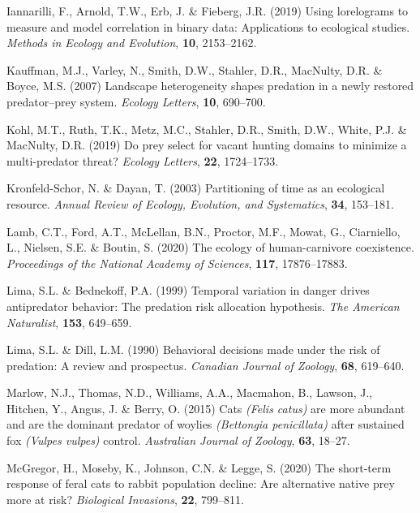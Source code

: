 \documentclass[]{elsarticle} %
\begin{document}
\leavevmode\hypertarget{ref-iannarilli2019lorelograms}{}%
Iannarilli, F., Arnold, T.W., Erb, J. \& Fieberg, J.R. (2019) Using lorelograms to measure and model correlation in binary data: Applications to ecological studies. \emph{Methods in Ecology and Evolution}, \textbf{10}, 2153--2162.

\leavevmode\hypertarget{ref-kauffman2007landscape}{}%
Kauffman, M.J., Varley, N., Smith, D.W., Stahler, D.R., MacNulty, D.R. \& Boyce, M.S. (2007) Landscape heterogeneity shapes predation in a newly restored predator--prey system. \emph{Ecology Letters}, \textbf{10}, 690--700.

\leavevmode\hypertarget{ref-kohl2019prey}{}%
Kohl, M.T., Ruth, T.K., Metz, M.C., Stahler, D.R., Smith, D.W., White, P.J. \& MacNulty, D.R. (2019) Do prey select for vacant hunting domains to minimize a multi-predator threat? \emph{Ecology Letters}, \textbf{22}, 1724--1733.

\leavevmode\hypertarget{ref-kronfeld2003partitioning}{}%
Kronfeld-Schor, N. \& Dayan, T. (2003) Partitioning of time as an ecological resource. \emph{Annual Review of Ecology, Evolution, and Systematics}, \textbf{34}, 153--181.

\leavevmode\hypertarget{ref-lamb2020ecology}{}%
Lamb, C.T., Ford, A.T., McLellan, B.N., Proctor, M.F., Mowat, G., Ciarniello, L., Nielsen, S.E. \& Boutin, S. (2020) The ecology of human-carnivore coexistence. \emph{Proceedings of the National Academy of Sciences}, \textbf{117}, 17876--17883.

\leavevmode\hypertarget{ref-lima1999temporal}{}%
Lima, S.L. \& Bednekoff, P.A. (1999) Temporal variation in danger drives antipredator behavior: The predation risk allocation hypothesis. \emph{The American Naturalist}, \textbf{153}, 649--659.

\leavevmode\hypertarget{ref-lima1990behavioral}{}%
Lima, S.L. \& Dill, L.M. (1990) Behavioral decisions made under the risk of predation: A review and prospectus. \emph{Canadian Journal of Zoology}, \textbf{68}, 619--640.

\leavevmode\hypertarget{ref-marlow2015cats}{}%
Marlow, N.J., Thomas, N.D., Williams, A.A., Macmahon, B., Lawson, J., Hitchen, Y., Angus, J. \& Berry, O. (2015) Cats \emph{(Felis catus)} are more abundant and are the dominant predator of woylies \emph{(Bettongia penicillata)} after sustained fox \emph{(Vulpes vulpes)} control. \emph{Australian Journal of Zoology}, \textbf{63}, 18--27.

\leavevmode\hypertarget{ref-mcgregor2020short}{}%
McGregor, H., Moseby, K., Johnson, C.N. \& Legge, S. (2020) The short-term response of feral cats to rabbit population decline: Are alternative native prey more at risk? \emph{Biological Invasions}, \textbf{22}, 799--811.
\end{document}
